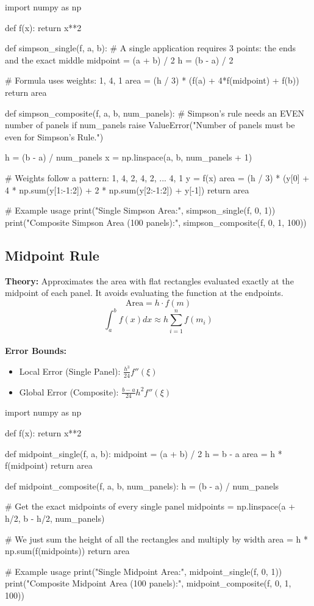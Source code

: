 \documentclass{article}
\begin{document}
\begin{jupytercode}
import numpy as np

def f(x):
    return x**2

def simpson_single(f, a, b):
    # A single application requires 3 points: the ends and the exact middle
    midpoint = (a + b) / 2
    h = (b - a) / 2
    
    # Formula uses weights: 1, 4, 1
    area = (h / 3) * (f(a) + 4*f(midpoint) + f(b))
    return area

def simpson_composite(f, a, b, num_panels):
    # Simpson's rule needs an EVEN number of panels
    if num_panels %
        raise ValueError("Number of panels must be even for Simpson's Rule.")
        
    h = (b - a) / num_panels
    x = np.linspace(a, b, num_panels + 1)
    
    # Weights follow a pattern: 1, 4, 2, 4, 2, ... 4, 1
    y = f(x)
    area = (h / 3) * (y[0] + 4 * np.sum(y[1:-1:2]) + 2 * np.sum(y[2:-1:2]) + y[-1])
    return area

# Example usage
print("Single Simpson Area:", simpson_single(f, 0, 1))
print("Composite Simpson Area (100 panels):", simpson_composite(f, 0, 1, 100))
\end{jupytercode}
\newpage

\subsection{Midpoint Rule}
\textbf{Theory:} Approximates the area with flat rectangles evaluated exactly at the midpoint of each panel. It avoids evaluating the function at the endpoints.
$$ \text{Area} = h \cdot f(m) $$
$$ \int_a^b f(x) dx \approx h \sum_{i=1}^{n} f(m_i) $$ \\
\textbf{Error Bounds:} 
\begin{itemize}
    \item Local Error (Single Panel): $\frac{h^3}{24}f''(\xi)$
    \item Global Error (Composite): $\frac{b-a}{24}h^2 f''(\xi)$
\end{itemize}

\begin{jupytercode}
import numpy as np

def f(x):
    return x**2

def midpoint_single(f, a, b):
    midpoint = (a + b) / 2
    h = b - a
    area = h * f(midpoint)
    return area

def midpoint_composite(f, a, b, num_panels):
    h = (b - a) / num_panels
    
    # Get the exact midpoints of every single panel
    midpoints = np.linspace(a + h/2, b - h/2, num_panels)
    
    # We just sum the height of all the rectangles and multiply by width
    area = h * np.sum(f(midpoints))
    return area

# Example usage
print("Single Midpoint Area:", midpoint_single(f, 0, 1))
print("Composite Midpoint Area (100 panels):", midpoint_composite(f, 0, 1, 100))
\end{jupytercode}
\newpage
\end{document}

